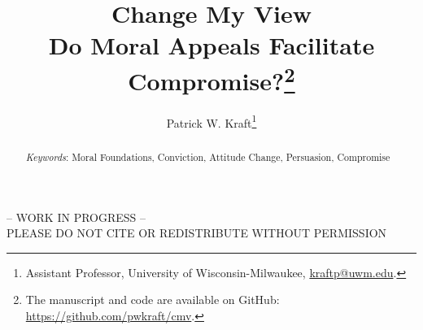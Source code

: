 \documentclass[12pt]{article}
\author{Patrick W. Kraft\footnote{Assistant Professor, University of Wisconsin-Milwaukee, \href{mailto:kraftp@uwm.edu}{kraftp@uwm.edu}.
}}
\title{Change My View\\
\large{Do Moral Appeals Facilitate Compromise?}\footnote{The manuscript and code are available on GitHub: \url{https://github.com/pwkraft/cmv}.}}
\date{}
\begin{document}
\maketitle
\doublespacing
\thispagestyle{empty}

\begin{center}
-- WORK IN PROGRESS -- \\
PLEASE DO NOT CITE OR REDISTRIBUTE WITHOUT PERMISSION
\end{center} 

\hfill
\begin{abstract}\singlespacing
\noindent 


\vspace{\baselineskip}
\noindent \textit{Keywords}: Moral Foundations, Conviction, Attitude Change, Persuasion, Compromise
\end{abstract}
\hfill

\newpage\setcounter{page}{1}


\clearpage
\singlespacing


\end{document}
